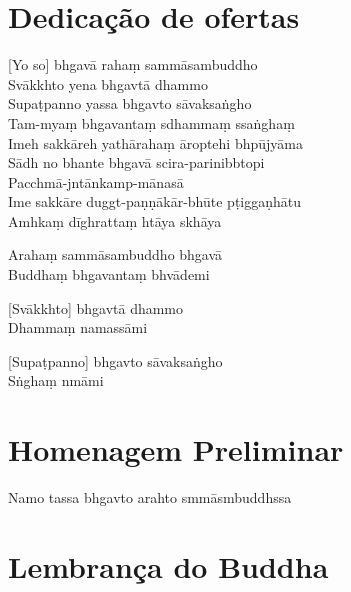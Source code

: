 
\chapter{Dedicação de ofertas}   %

[Yo so] bhgavā rahaṃ sammāsambuddho\\
Svākkhto yena bhgavtā dhammo\\
Supaṭpanno yassa bhgavto sāvaksaṅgho\\
Tam-myaṃ bhgavantaṃ sdhammaṃ ssaṅghaṃ\\
Imeh sakkāreh yathārahaṃ āroptehi bhpūjyāma\\
Sādh no bhante bhgavā scira-parinibbtopi\\
Pacchmā-jntānkamp-mānasā\\
Ime sakkāre duggt-paṇṇākār-bhūte pṭiggaṇhātu\\
Amhkaṃ dīghrattaṃ htāya skhāya

Arahaṃ sammāsambuddho bhgavā\\
Buddhaṃ bhgavantaṃ bhvādemi 

[Svākkhto] bhgavtā dhammo\\
Dhammaṃ namassāmi 

[Supaṭpanno] bhgavto sāvaksaṅgho\\
Sṅghaṃ nmāmi 

\chapter{Homenagem Preliminar}

\begin{leader}
\end{leader}

Namo tassa bhgavto arahto smmāsmbuddhssa


\clearpage

\chapter{Lembrança do Buddha}     %

